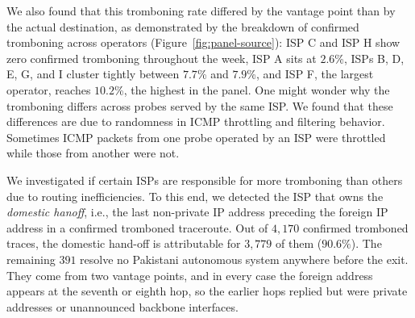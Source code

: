 \documentclass[sigconf,anonymous,10pt]{acmart}
\begin{document}
We also found that this tromboning rate differed by the vantage point than by the actual destination, as demonstrated by the breakdown of confirmed tromboning across operators (Figure~\ref{fig:panel-source}): ISP C and ISP H show zero confirmed tromboning throughout the week, ISP A sits at $2.6$\%, ISPs B, D, E, G, and I cluster tightly between $7.7$\% and $7.9$\%, and ISP F, the largest operator, reaches $10.2$\%, the highest in the panel. One might wonder why the tromboning differs across probes served by the same ISP. We found that these differences are due to randomness in ICMP throttling and filtering behavior. Sometimes ICMP packets from one probe operated by an ISP were throttled while those from another were not.   




We investigated if certain ISPs are responsible for more tromboning than others due to routing inefficiencies. To this end, we detected the ISP that owns the \textit{domestic hanoff}, i.e., the last non-private IP address preceding the foreign IP address in a confirmed tromboned traceroute. %
Out of $4{,}170$ confirmed tromboned traces, the domestic hand-off is attributable for $3{,}779$ of them ($90.6\%$). The remaining $391$ resolve no Pakistani autonomous system anywhere before the exit. They come from two vantage points, and in every case the foreign address appears at the seventh or eighth hop, so the earlier hops replied but were private addresses or unannounced backbone interfaces.
\end{document}
